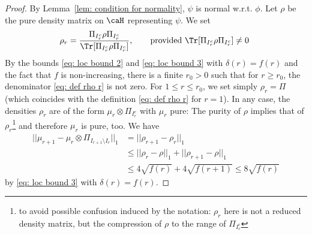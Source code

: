 \begin{proof}
	By Lemma~\ref{lem: condition for normality}, $\psi$ is normal w.r.t. $\phi$. Let $\rho$ be the pure density matrix on $\caH$ representing $\psi$.
	We set 
	\begin{equation} \label{eq: def rho r}
	\rho_r= \frac{\Pi_{I_{r}^c}\rho \Pi_{I_{r}^c}}{\Tr[\Pi_{I_{r}^c}\rho \Pi_{I_{r}^c}]}, \qquad \text{provided  $\Tr[\Pi_{I_{r}^c}\rho \Pi_{I_{r}^c}] \neq 0$  }  
	\end{equation}  
	By the bounds \eqref{eq: loc bound 2} and \eqref{eq: loc bound 3} with $\delta(r)=f(r)$ and the fact that $f$ is non-increasing, there is a finite $r_0>0$ such that for $r\geq r_0$, the denominator  \eqref{eq: def rho r} is not zero.
	For $1 \leq r\leq r_0$, we set simply $\rho_r=\Pi$ (which coincides with the definition \eqref{eq: def rho r} for $r=1$).  In any case, the densities $\rho_r$ are of the form $\mu_r\otimes \Pi_{I_r^c}$ with $\mu_r$ pure: The purity of $\rho$ implies that of $\rho_r$\footnote{to avoid possible confusion induced by the notation: $\rho_r$ here is not a reduced density matrix, but the compression of $\rho$ to the range of $\Pi_{I_{r}^c}$} and therefore $\mu_r$ is pure, too.
	We have
	\begin{align*}
	||\mu_{r+1}-\mu_r\otimes \Pi_{I_{r+1}\setminus I_r}||_1 &= ||\rho_{r+1}-\rho_r||_1 \\
	&\leq ||\rho_r-\rho||_1 +||\rho_{r+1}-\rho||_1 \\
	&\leq  4\sqrt{f(r)}+4\sqrt{f(r+1)} \leq 8\sqrt{f(r)}
	\end{align*}
	by \eqref{eq: loc bound 3} with  $\delta(r)=f(r)$.
	

\end{proof}
